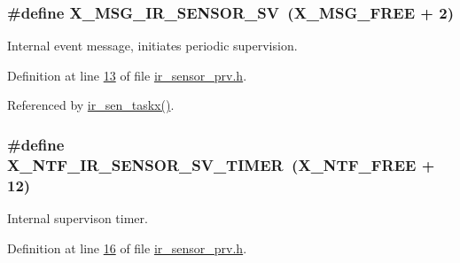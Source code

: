 \hypertarget{a00023_a16b09a45fdc504b8b00d634b49c820b4}{
\subsubsection[{X\+\_\+\+M\+S\+G\+\_\+\+I\+R\+\_\+\+S\+E\+N\+S\+O\+R\+\_\+\+S\+V}]{\setlength{\rightskip}{0pt plus 5cm}\#define X\+\_\+\+M\+S\+G\+\_\+\+I\+R\+\_\+\+S\+E\+N\+S\+O\+R\+\_\+\+S\+V~({\bf X\+\_\+\+M\+S\+G\+\_\+\+F\+R\+E\+E} + 2)}}\label{a00023_a16b09a45fdc504b8b00d634b49c820b4}


Internal event message, initiates periodic supervision. 



Definition at line \hyperlink{a00023_source_l00013}{13} of file \hyperlink{a00023_source}{ir\+\_\+sensor\+\_\+prv.\+h}.



Referenced by \hyperlink{a00045_source_l00069}{ir\+\_\+sen\+\_\+taskx()}.

\hypertarget{a00023_a3b0f15b601361fafa871c5e49df7842d}{
\subsubsection[{X\+\_\+\+N\+T\+F\+\_\+\+I\+R\+\_\+\+S\+E\+N\+S\+O\+R\+\_\+\+S\+V\+\_\+\+T\+I\+M\+E\+R}]{\setlength{\rightskip}{0pt plus 5cm}\#define X\+\_\+\+N\+T\+F\+\_\+\+I\+R\+\_\+\+S\+E\+N\+S\+O\+R\+\_\+\+S\+V\+\_\+\+T\+I\+M\+E\+R~({\bf X\+\_\+\+N\+T\+F\+\_\+\+F\+R\+E\+E} + 12)}}\label{a00023_a3b0f15b601361fafa871c5e49df7842d}


Internal supervison timer. 



Definition at line \hyperlink{a00023_source_l00016}{16} of file \hyperlink{a00023_source}{ir\+\_\+sensor\+\_\+prv.\+h}.



